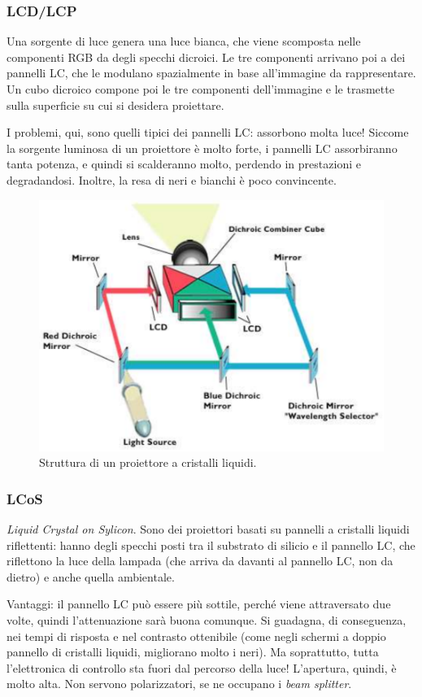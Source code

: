 \documentclass[a4paper,11pt]{article}
\begin{document}
\subsubsection{LCD/LCP}
Una sorgente di luce genera una luce bianca, che viene scomposta nelle componenti RGB da degli specchi dicroici. Le tre componenti
arrivano poi a dei pannelli LC, che le modulano spazialmente in base all'immagine da rappresentare. Un cubo dicroico compone poi le tre
componenti dell'immagine e le trasmette sulla superficie su cui si desidera proiettare.
\par
I problemi, qui, sono quelli tipici dei pannelli LC: assorbono molta luce! Siccome la sorgente luminosa di un proiettore è molto forte,
i pannelli LC assorbiranno tanta potenza, e quindi si scalderanno molto, perdendo in prestazioni e degradandosi.
Inoltre, la resa di neri e bianchi è poco convincente.

\renewcommand{\thefigure}{4.25}
\begin{figure}[!h]
  \centering
    \includegraphics[scale=0.45]{images/4/lcd_projector.png}
    \caption{Struttura di un proiettore a cristalli liquidi.}
\end{figure}

\subsubsection{LCoS}
\textit{Liquid Crystal on Sylicon}. Sono dei proiettori basati su pannelli a cristalli liquidi riflettenti: hanno degli specchi posti tra il substrato di silicio e il pannello
LC, che riflettono la luce della lampada (che arriva da davanti al pannello LC, non da dietro) e anche quella ambientale.
\par
Vantaggi: il pannello LC può essere più sottile, perché viene attraversato due volte, quindi
l'attenuazione sarà buona comunque. Si guadagna, di conseguenza, nei tempi di risposta e nel contrasto ottenibile (come negli schermi a doppio pannello di cristalli liquidi,
migliorano molto i neri). Ma soprattutto, tutta l'elettronica di controllo sta fuori dal percorso della luce! L'apertura, quindi, è molto alta. Non servono polarizzatori, se ne occupano i
\textit{beam splitter}.
\end{document}
